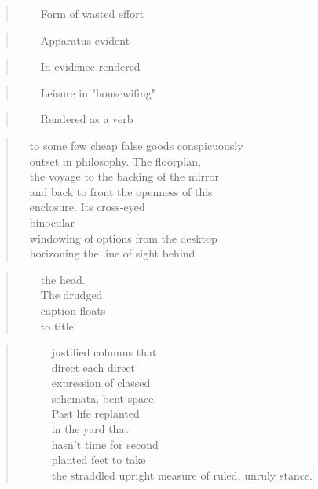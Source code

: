 \documentclass[
]{memoir}
\begin{document}
\begin{verse}
    Form of wasted effort\\
\end{verse}

\begin{verse}
    Apparatus evident\\
\end{verse}

\begin{verse}
    In evidence rendered\\
\end{verse}

\begin{verse}
    Leisure in "housewifing"\\
\end{verse}

\begin{verse}
    Rendered as a verb\\
\end{verse}

\begin{verse}
  to some few cheap false goods conspicuously\\
  outset in philosophy. The floorplan,\\
  the voyage to the backing of the mirror\\
  and back to front the openness of this\\
  enclosure. Its cross-eyed\\
  binocular\\
  windowing of options from the desktop\\
  horizoning the line of sight behind\\
\end{verse}

\begin{verse}
    the head.\\
    The drudged\\
    caption floats\\
    to title\\
\end{verse}

\begin{verse}
      justified columns that\\
      direct each direct\\
      expression of classed\\
      schemata, bent space.\\
      Past life replanted\\
      in the yard that\\
      hasn’t time for second\\
      planted feet to take\\
      the straddled upright measure of ruled, unruly stance.\\
\end{verse}
\end{document}
